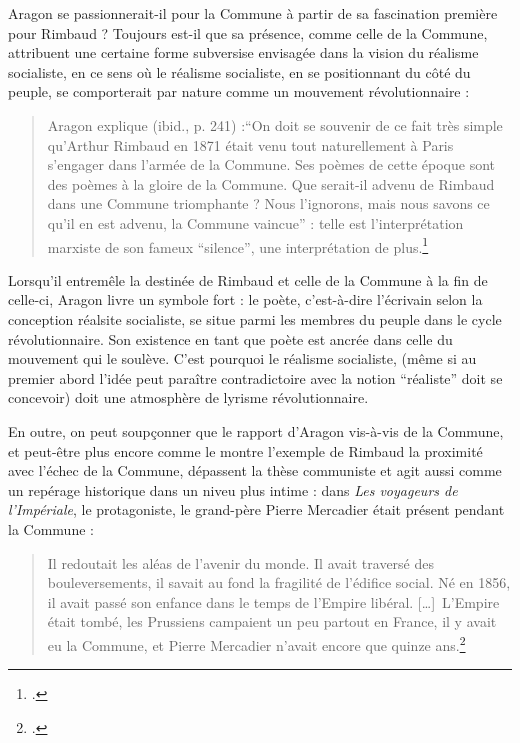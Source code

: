Aragon se passionnerait-il pour la Commune à partir de sa fascination première pour Rimbaud ? Toujours est-il que sa présence, comme celle de la Commune, attribuent une certaine forme subversise envisagée dans la vision du réalisme socialiste, en ce sens où le réalisme socialiste, en se positionnant du côté du peuple, se comporterait par nature comme un mouvement révolutionnaire :

\begin{quote}
Aragon explique (ibid., p. 241) :\enquote{On doit se souvenir de ce fait très simple qu’Arthur Rimbaud en 1871 était venu tout naturellement à Paris s’engager dans l’armée de la Commune. Ses poèmes de cette époque sont des poèmes à la gloire de la Commune. Que serait-il advenu de Rimbaud dans une Commune triomphante ? Nous l’ignorons, mais nous savons ce qu’il en est advenu, la Commune vaincue} : telle est l’interprétation marxiste de son fameux \enquote{silence}, une interprétation de plus.\footcite[p241]{these}	
\end{quote} 

Lorsqu'il entremêle la destinée de Rimbaud et celle de la Commune à la fin de celle-ci, Aragon livre un symbole fort : le poète, c'est-à-dire l'écrivain selon la conception réalsite socialiste, se situe parmi les membres du peuple dans le cycle révolutionnaire. Son existence en tant que poète est ancrée dans celle du mouvement qui le soulève. C'est pourquoi le réalisme socialiste, (même si au premier abord l'idée peut paraître contradictoire avec la notion \enquote{réaliste} doit se concevoir) doit une atmosphère de lyrisme révolutionnaire. 

En outre, on peut soupçonner que le rapport d'Aragon vis-à-vis de la Commune, et peut-être plus encore comme le montre l'exemple de Rimbaud la proximité avec l'échec de la Commune, dépassent la thèse communiste et agit aussi comme un repérage historique dans un niveu plus intime : dans \emph{Les voyageurs de l'Impériale}, le protagoniste, le grand-père Pierre Mercadier était présent pendant la Commune : 
\begin{quote}
 Il redoutait les aléas de l’avenir du monde. Il avait traversé des bouleversements, il savait au fond la fragilité de l’édifice social. Né en 1856, il avait passé son enfance dans le temps de l’Empire libéral. […] L’Empire était tombé, les Prussiens campaient un peu partout en France, il y avait eu la Commune, et Pierre Mercadier n’avait encore que quinze ans.\footcite[p43]{voyageursdelimperiale}\end{quote}

